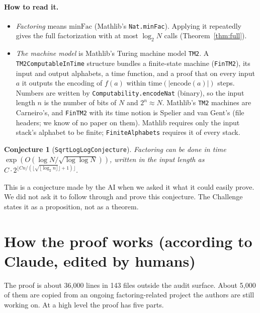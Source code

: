 \documentclass[11pt]{article}
\newtheorem{conjecture}{Conjecture}
\newcommand{\code}[1]{\texttt{#1}}
\begin{document}
\paragraph{How to read it.}
\begin{itemize}
\item \emph{Factoring} means $\mathrm{minFac}$ (Mathlib's \code{Nat.minFac}). Applying it repeatedly gives the full factorization with at most $\log_2 N$ calls (Theorem~\ref{thm:full}).
\item \emph{The machine model} is Mathlib's Turing machine model \code{TM2}.
 A \code{TM2ComputableInTime} structure bundles a
  finite-state machine (\code{FinTM2}), its input and output alphabets, a time function, and a proof that on every
  input $a$ it outputs the encoding of $f(a)$ within $\mathrm{time}(|\mathrm{encode}(a)|)$ steps. Numbers are
  written by \code{Computability.encodeNat} (binary), so the input length $n$ is the number of bits of $N$ and
  $2^n\approx N$. Mathlib's \code{TM2} machines are Carneiro's, and \code{FinTM2} with its time
  notion is Spelier and van Gent's (file headers; we know of no paper on them). Mathlib requires only the input stack's alphabet to be finite;
  \code{FiniteAlphabets} requires it of every stack.
\end{itemize}

\begin{conjecture}[\code{SqrtLogLogConjecture}]\label{conj:b}
Factoring can be done in time $\exp(O(\log N/\sqrt{\log\log N}))$, written in the input length as
$C\cdot2^{\lfloor Cn/(\lfloor\sqrt{\lfloor\log_2 n\rfloor}\rfloor+1)\rfloor}$.
\end{conjecture}
This is a conjecture made by the AI when we asked it what it could easily prove. We did not ask it to follow through and prove this conjecture. 
The Challenge states it as a proposition, not as a theorem.

\section{How the proof works (according to Claude, edited by humans)}\label{sec:proof}

The proof is about 36{,}000 lines in 143 files outside the audit surface. About 5{,}000
of them are copied from an ongoing factoring-related project the authors are still working on.
At a high level the proof has five parts.
\end{document}
